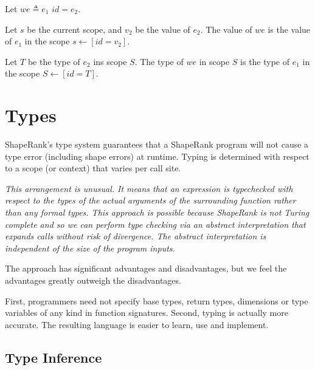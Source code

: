 \documentclass{article}
\begin{document}
{\WhereBindingExpression{}

\VALIDENT{}


Let $we \triangleq e_1$ \WHERE{} $id = e_2$.

Let $s$ be the current scope, and $v_2$ be the value of $e_2$. The value of $we$ is the value of $e_1$ in the scope $s \leftarrow [id = v_2]$.

Let $T$ be the type of $e_2$ ins scope $S$. The type of $we$ in scope $S$ is the type of $e_1$ in the scope $S \leftarrow [id = T]$.


\section{Types}
\label{types}

ShapeRank's type system guarantees that a ShapeRank program will not cause a type error (including shape errors) at runtime. 
Typing is determined with respect to a scope (or context) that varies per call site. 

{\it
This arrangement is unusual. It means that an expression is typechecked with respect to the types of the actual arguments of the surrounding function rather  than any
formal types. This approach is possible because ShapeRank is not Turing complete and so we can perform type checking via an abstract interpretation that expands calls without risk of
divergence. The abstract interpretation is independent of the size of the program inputs.

The approach has significant advantages and disadvantages, but we feel the advantages greatly outweigh the disadvantages.

First, programmers need not specify base types, return types,  dimensions or type variables of any kind in function signatures. Second, typing is actually more accurate.
The resulting language is easier to learn, use and implement.
} 




{\em 
}

 \subsection{Type Inference}
  \label{typeInference}

}
\end{document}
